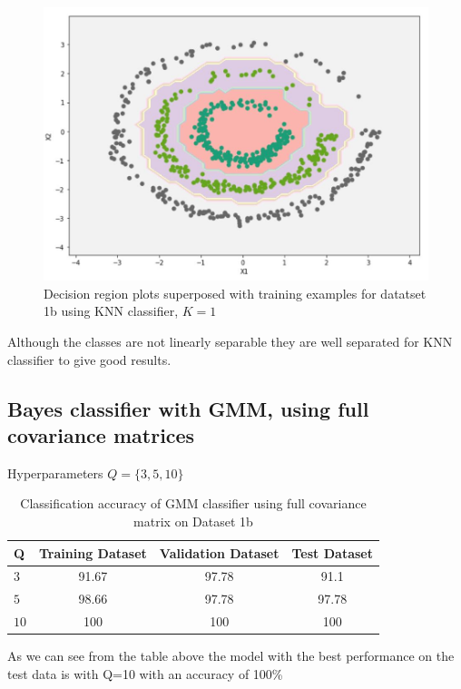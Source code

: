 \documentclass[11pt]{article}
\begin{document}
\begin{figure}[h]
\centering
\includegraphics[scale=0.35]{dataset1b_k7_knn.jpg}	
\caption{Decision region plots superposed with training examples for datatset 1b using KNN classifier, $K=1$}
\label{fig:fig2.1.1}
\end{figure}

Although the classes are not linearly separable they are well separated for KNN classifier to give good results.
\newpage
\subsection{Bayes classifier with GMM, using full covariance matrices}
Hyperparameters $Q = \{3,5,10\}$
\begin{table}[h!]
\label{tab:tab1.1.1}
\begin{center}
\begin{tabular}{|l|c|c|c|}
\hline
\textbf{Q } & \textbf{Training Dataset} & \textbf{Validation Dataset} &\textbf{Test Dataset}\\
\hline
$3$ & 91.67 & 97.78 & 91.1\\
\hline
$5$ & 98.66 & 97.78 & 97.78\\
\hline
$10$ & 100 & 100 & 100\\
\hline
\end{tabular}
\caption{Classification accuracy of GMM classifier using full covariance matrix on Dataset 1b}
\end{center}
\end{table}

As we can see from the table above the model with the best performance on the test data is with  Q=10 with an accuracy of 100\% 
\end{document}
